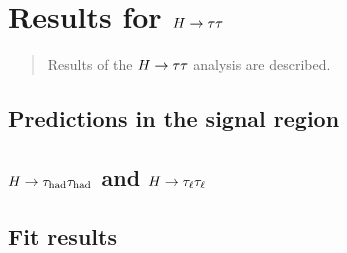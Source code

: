 \chapter[Results for $\Htautau$][Results for $\Htautau$]{Results for $\Htautau$}
\label{chap:results}

\begin{quote}
Results of the $\Htautau$ analysis are described.
\end{quote}

\section{Predictions in the signal region}
\label{sec:results-prefit}

\section{$H\rightarrow\tau_\text{had}\tau_\text{had}$ and $H\rightarrow\tau_\ell\tau_\ell$}
\label{sec:results-hhll}

\section{Fit results}
\label{sec:results-fit}

\clearpage

